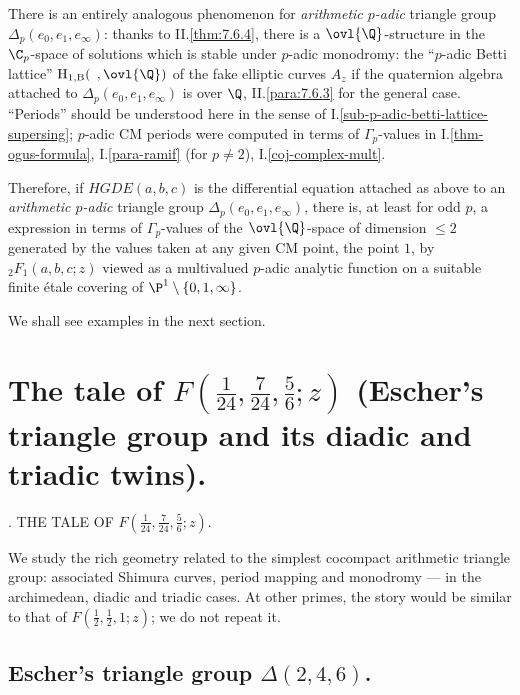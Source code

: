 \begin{para}\label{para::5.6.3} There is an entirely analogous phenomenon for
 {\it arithmetic $p$-adic} triangle 
group $\Delta_p(e_0,e_1,e_\infty)$: thanks to II.\ref{thm:7.6.4}, there is a
 $\ovl{\Q}$-structure in 
the $\C_p$-space of solutions which is stable under $p$-adic monodromy:
 the ``$p$-adic Betti lattice''
 $\mathrm{H}_{1,\mathrm{B}}({\;\,},\ovl{\Q})$ of the fake 
 elliptic 
 curves $A_z$ if the quaternion algebra attached to
 $\Delta_p(e_0,e_1,e_\infty)$ is over $\Q$, \cf II.\ref{para:7.6.3} for the
 general case. ``Periods'' should be understood here in the sense of
 I.\ref{sub-p-adic-betti-lattice-supersing}; $p$-adic CM periods
 were computed in terms of $\Gamma_p$-values 
 in I.\ref{thm-ogus-formula}, I.\ref{para-ramif} (for $p\neq 2$), 
 I.\ref{coj-complex-mult}.

 Therefore, if $HGDE(a,b,c)$ is the differential equation attached as
 above to an {\it arithmetic $p$-adic} triangle group
 $\Delta_p(e_0,e_1,e_\infty)$, there is, at least for odd $p$, a
 expression in terms of $\Gamma_p$-values of the $\ovl{\Q}$-space of
 dimension $\leq 2$ generated by the values taken at any given CM point, \eg
 the point $1$, by ${}_2F_1(a,b,c;z)$ viewed as a multivalued $p$-adic
 analytic function on a suitable finite \'etale covering of
 $\P^1\setminus\{0,1,\infty\}$.

 We shall see examples in the next section.
\end{para}

\newpage

\section{The tale of $F(\frac{1}{24},\frac{7}{24},\frac{5}{6};z)$
(Escher's triangle group and its diadic and triadic twins).}\label{sec::6}
 
%
{\thesection. THE TALE OF $F(\frac{1}{24},\frac{7}{24},\frac{5}{6};z)$.}

\begin{abst}
 We study the rich geometry related to the simplest cocompact arithmetic
 triangle group: associated Shimura curves, period mapping and monodromy
 --- in the archimedean, diadic and triadic cases. At other primes, the
 story would be similar to that of $F(\frac{1}{2},\frac{1}{2},{1};z)$;
 we do not repeat it.
\end{abst}

\subsection{Escher's triangle group $\Delta(2,4,6)$.}\label{sub::6.1}

